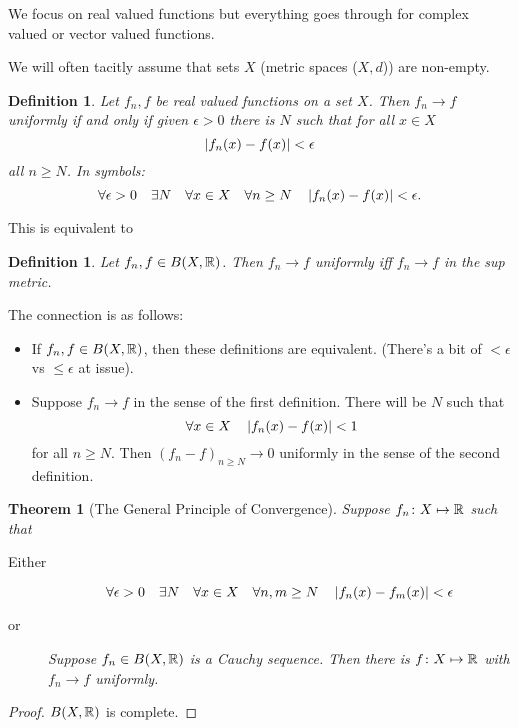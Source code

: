 \documentclass{notes}
\theoremstyle{plain}
\newtheorem{theorem}[proposition]{Theorem}
\newtheorem{definition}[proposition]{Definition}
\newcommand{\Forall}[1]{\forall #1 \quad}
\newcommand{\Exists}[1]{\exists #1 \quad}
\begin{document}
We focus on real valued functions but everything goes through for 
complex valued or vector valued functions.

We will often tacitly assume that sets $ X $ (metric spaces ($ X,d $))
are non-empty.

\begin{definition}
Let $ f_{n}, f $ be real valued functions on a set $ X $. Then $ 
f_{n} \to f $ uniformly if and only if given $ \epsilon>0 
$ there is $ N $ such that for all $ x \in X $
\[ \left|f_{n}(x)-f(x)\right|<\epsilon \]
all $ n \geq N $.  In symbols:
\[ \Forall{\epsilon>0} \Exists{N} \Forall{x \in X} \Forall{n \geq N} 
\abs{f_{n}(x)-f(x)} < \epsilon. \]
\end{definition}

This is equivalent to

\begin{definition}
Let $ f_{n}, f \in B(X,\mathbb{R}) $. Then $ f_{n} \to f $ 
uniformly iff $ f_{n} \to f  $ in the sup metric.
\end{definition}

The connection is as follows:
\begin{itemize}
\item If $ f_{n}, f \in B(X, \mathbb{R}) $, then these definitions
are equivalent. (There's a bit of $ <\epsilon $ vs $ \leq \epsilon $ 
at issue).

\item Suppose $ f_{n} \to f $ in the sense of the first definition.
There will be $ N $ such that
\[ \Forall{x \in X} \abs{f_{n}(x)-f(x)} < 1 \] for all $ n \geq N $.
Then $(f_{n}-f)_{n \geq N} \to 0$ uniformly in the sense 
of the second definition.
\end{itemize}

\begin{theorem}[The General Principle of Convergence]
Suppose $ f_{n}\colon  X \mapsto \mathbb{R} $ such that

\begin{description}
\item[Either] \[ \Forall{\epsilon>0} \Exists{N} \Forall{x \in X} 
\Forall{n,m \geq N} \abs{f_{n}(x)-f_{m}(x)} < \epsilon \]
\item[or] Suppose $ f_{n}\in B(X, \mathbb{R}) $ is a Cauchy sequence.
Then there is $ f\colon  X \mapsto \mathbb{R} $ with $ f_{n} \to f 
$ uniformly.
\end{description}
\end{theorem}

\begin{proof}
$B(X,\mathbb{R})$ is complete.
\end{proof}
\end{document}
